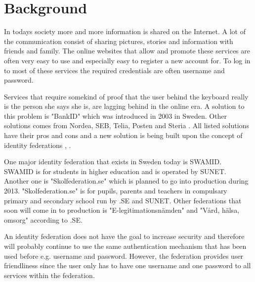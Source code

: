 \section{Background}
In todays society more and more information is shared on the Internet.
A lot of the communication consist of sharing pictures, stories and information with friends and family.
The online websites that allow and promote these services are often very easy to use and especially easy to register a new account for.
To log in to most of these services the required credentials are often username and password. 

Services that require somekind of proof that the user behind the keyboard really is the person she says she is, are lagging behind in the online era.
A solution to this problem is "BankID" which was introduced in 2003 \cite{website:bankid-about} in Sweden.
Other solutions comes from Nordea, SEB, Telia, Posten and Steria \cite[p.~256]{pdf:SOU}.
All listed solutions have their pros and cons and a new solution is being built upon the concept of identity federations \cite[p.~23]{pdf:SOU}, \cite{website:elegnamnd}.


One major identity federation that exists in Sweden today is SWAMID. SWAMID is for students in higher education and is operated by SUNET.
Another one is "Skolfederation.se" \cite{website:skolfed} which is planned to go into production during 2013.
"Skolfederation.se" is for pupils, parents and teachers in compulsary primary and secondary school run by .SE and SUNET. 
Other federations that soon will come in to production is "E-legitimationsn{\"a}mden" \cite{website:elegnamnd} and "V\r{a}rd, h{\"a}lsa, omsorg" according to .SE.  

An identity federation does not have the goal to increase security and therefore will probably continue to use the same authentication mechanism that has been used before e.g. username and password. 
However, the federation provides user friendliness since the user only has to have one username and one password to all services within the federation. 

